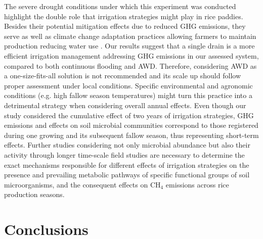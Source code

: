 The severe drought conditions under which this experiment was conducted highlight the double role that irrigation strategies might play in rice paddies. Besides their potential mitigation effects due to reduced GHG emissions, they serve as well as climate change adaptation practices allowing farmers to maintain production reducing water use \citep{ye2013}. Our results suggest that a single drain is a more efficient irrigation management addressing GHG emissions in our assessed system, compared to both continuous flooding and AWD. Therefore, considering AWD as a one-size-fits-all solution is not recommended and its scale up should follow proper assessment under local conditions. Specific environmental and agronomic conditions (e.g. high fallow season temperatures) might turn this practice into a detrimental strategy when considering overall annual effects. Even though our study considered the cumulative effect of two years of irrigation strategies, GHG emissions and effects on soil microbial communities correspond to those registered during one growing and its subsequent fallow season, thus representing short-term effects. Further studies considering not only microbial abundance but also their activity through longer time-scale field studies are necessary to determine the exact mechanisms responsible for different effects of irrigation strategies on the presence and prevailing metabolic pathways of specific functional groups of soil microorganisms, and the consequent effects on CH$_{4}$ emissions across rice production seasons.\\ 

\section{Conclusions}
\label{sec:conc2}

